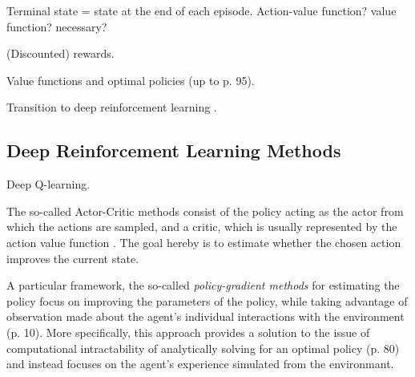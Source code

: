 Terminal state = state at the end of each episode.
Action-value function? value function? necessary?


(Discounted) rewards.

Value functions and optimal policies (up to p. 95).

Transition to deep reinforcement learning \parencite{lecun2015deep}.

\subsection{Deep Reinforcement Learning Methods}

Deep Q-learning. 

The so-called Actor-Critic methods consist of the policy acting as the actor from which the actions are sampled, and a critic, which is usually represented by the action value function . The goal hereby is to estimate whether the chosen action improves the current state.  

 A particular framework, the so-called \textit{policy-gradient methods} for estimating the policy focus on improving the parameters of the policy, while taking advantage of observation made about the agent's individual interactions with the environment (p. 10). More specifically, this approach provides a solution to the issue of computational intractability of analytically solving for an optimal policy (p. 80) and instead focuses on the agent's experience simulated from the environmant.  



